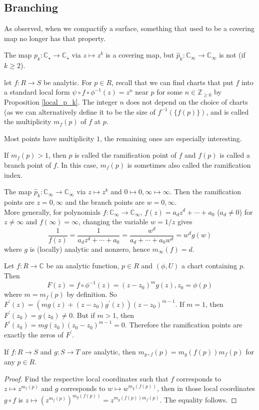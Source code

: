 \subsection{Branching}
As observed, when we compactify a surface, something that used to be a covering map no longer has that property.
\begin{example}
    The map $p_k:\mathbb C_\star\to\mathbb C_\star$ via $z\mapsto z^k$ is a covering map, but $\hat{p}_k:\mathbb C_\infty\to\mathbb C_\infty$ is not (if $k\ge 2$).
\end{example}
\begin{definition}
    let $f:R\to S$ be analytic.
    For $p\in R$, recall that we can find charts that put $f$ into a standard local form $\psi\circ f\circ\phi^{-1}(z)=z^n$ near $p$ for some $n\in\mathbb Z_{\ge 0}$ by Proposition \ref{local_p_k}.
    The integer $n$ does not depend on the choice of charts (as we can alternatively define it to be the size of $f^{-1}(\{f(p)\})$, and is called the multiplicity $m_f(p)$ of $f$ at $p$.
\end{definition}
Most points have multiplicity $1$, the remaining ones are especially interesting.
\begin{definition}
    If $m_f(p)>1$, then $p$ is called the ramification point of $f$ and $f(p)$ is called a branch point of $f$.
    In this case, $m_f(p)$ is sometimes also called the ramification index.
\end{definition}
\begin{example}
    The map $\hat{p}_k:\mathbb C_\infty\to\mathbb C_\infty$ via $z\mapsto z^k$ and $0\mapsto 0,\infty\mapsto\infty$.
    Then the ramification points are $z=0,\infty$ and the branch points are $w=0,\infty$.\\
    More generally, for polynomials $f:\mathbb C_\infty\to\mathbb C_\infty$, $f(z)=a_dz^d+\cdots+a_0$ ($a_d\neq 0$) for $z\neq\infty$ and $f(\infty)=\infty$, changing the variable $w=1/z$ gives
    $$\frac{1}{f(z)}=\frac{1}{a_dz^d+\cdots+a_0}=\frac{w^d}{a_d+\cdots+a_0w^d}=w^dg(w)$$
    where $g$ is (locally) analytic and nonzero, hence $m_\infty(f)=d$.
\end{example}
\begin{remark}
    Let $f:R\to\mathbb C$ be an analytic function, $p\in R$ and $(\phi,U)$ a chart containing $p$.
    Then
    $$F(z)=f\circ\phi^{-1}(z)=(z-z_0)^mg(z),z_0=\phi(p)$$
    where $m=m_f(p)$ by definition.
    So $F^\prime(z)=(mg(z)+(z-z_0)g^\prime(z))(z-z_0)^{m-1}$.
    If $m=1$, then $F^\prime(z_0)=g(z_0)\neq 0$.
    But if $m>1$, then $F^\prime(z_0)=mg(z_0)(z_0-z_0)^{m-1}=0$.
    Therefore the ramification points are exactly the zeros of $F^\prime$.
\end{remark}
\begin{lemma}
    If $f:R\to S$ and $g:S\to T$ are analytic, then $m_{g\circ f}(p)=m_g(f(p))m_f(p)$ for any $p\in R$.
\end{lemma}
\begin{proof}
    Find the respective local coordinates such that $f$ corresponds to $z\mapsto z^{m_f(p)}$ and $g$ corresponds to $w\mapsto w^{m_g(f(p))}$, then in those local coordinates $g\circ f$ is $z\mapsto(z^{m_f(p)})^{m_g(f(p))}=z^{m_g(f(p))m_f(p)}$.
    The equality follows.
\end{proof}